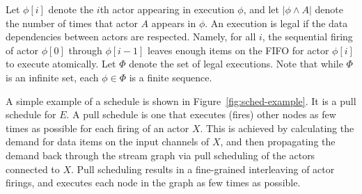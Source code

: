 


Let $\phi[i]$ denote the $i$th actor appearing in execution $\phi$,
and let $|\phi \wedge A|$ denote the number of times that actor $A$
appears in $\phi$. An execution is legal if the data dependencies
between actors are respected. Namely, for all $i$, the sequential
firing of actor $\phi[0]$ through $\phi[i-1]$ leaves enough items on
the FIFO for actor $\phi[i]$ to execute atomically. Let $\Phi$ denote
the set of legal executions. Note that while $\Phi$ is an infinite
set, each $\phi \in \Phi$ is a finite sequence.

\begin{figure*}[t]
\begin{center}
\vspace{-12pt}
\vspace{-4pt}
\caption{\small The stream graphs illustrate a steady
state cycle of a ``pull schedule''; execution proceeds from left to
right, and channels are annotated with the number of items present.
The second line lists the actors that fire in a pull schedule for
$E$.
\protect\label{fig:sched-example}}
\end{center}
\vspace{-12pt}
\end{figure*}

A simple example of a schedule is shown in
Figure~\ref{fig:sched-example}. It is a pull schedule for $E$. A pull
schedule is one that executes (fires) other nodes as few times as
possible for each firing of an actor $X$. This is achieved by
calculating the demand for data items on the input channels of $X$,
and then propagating the demand back through the stream graph via pull
scheduling of the actors connected to $X$. Pull scheduling results in
a fine-grained interleaving of actor firings, and executes each node
in the graph as few times as possible.

